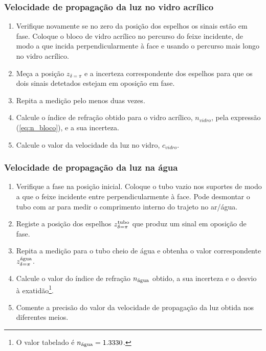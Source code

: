 \documentclass[a4paper,12pt]{article}      %
\begin{document}
\subsubsection{\sf Velocidade de propagação da luz no vidro acrílico}
\begin{enumerate}
\item Verifique novamente se no zero da posição dos espelhos os sinais estão em fase. Coloque o bloco de vidro 
acrílico no percurso do feixe incidente, de modo a que incida perpendicularmente à face e usando o percurso 
mais longo no vidro acrílico. 
\item Meça a posição $z_{\delta=\pi}$ e a incerteza correspondente dos espelhos para que os dois sinais detetados estejam em oposição em fase. 
\item Repita a medição pelo menos duas vezes.
\item Calcule o índice de refração obtido para o vidro acrílico, $n_{vidro}$, pela expressão (\ref{eq:n_bloco}),  e a sua incerteza. 
\item Calcule o valor da velocidade da luz no vidro, $c_{vidro}$.

\end{enumerate}

\subsubsection{\sf Velocidade de propagação da luz na água}
\begin{enumerate}
\item Verifique a fase na posição inicial. Coloque o tubo vazio  nos suportes de modo a que o feixe incidente entre perpendicularmente à face. Pode desmontar o tubo com ar para medir o comprimento interno do trajeto no ar/água.
\item Registe a posição dos espelhos $z_{\delta=\pi}^{\textup{tubo}}$ que produz um sinal em oposição de fase. 
\item Repita a medição para o tubo cheio de água e obtenha o valor correspondente $z_{\delta=\pi}^{\textup{água}}$. 
\item Calcule o valor do índice de refração $n_{\textup{água}}$ obtido, a sua incerteza e o desvio à exatidão\footnote{O valor tabelado é $n_{\textup{água}}=1.3330$.}. 
\item Comente a precisão do valor da velocidade de propagação da luz obtida nos 
diferentes meios.
\end{enumerate}
\end{document}
